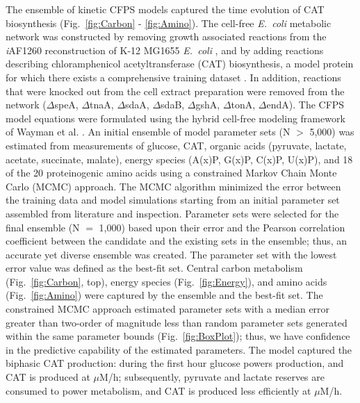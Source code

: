 \documentclass[12pt]{article}
\begin{document}
The ensemble of kinetic CFPS models captured the time evolution of CAT biosynthesis (Fig.~\ref{fig:Carbon} - \ref{fig:Amino}).
The cell-free \textit{E.~coli} metabolic network was constructed by removing growth associated reactions from the \textit{i}AF1260 reconstruction of K-12 MG1655 \textit{E.~coli} \cite{Feist:2007aa}, and by adding reactions describing chloramphenicol acetyltransferase (CAT) biosynthesis, a model protein for which there exists a comprehensive training dataset \cite{2005_calhoun_BiotechnologyProgress}.
In addition, reactions that were knocked out from the cell extract preparation were removed from the network ($\Delta$speA, $\Delta$tnaA, $\Delta$sdaA, $\Delta$sdaB, $\Delta$gshA, $\Delta$tonA, $\Delta$endA).
The CFPS model equations were formulated using the hybrid cell-free modeling framework of Wayman et al. \cite{pr3010138}.
An initial ensemble of model parameter sets (N $>$ 5,000) was estimated from measurements of glucose, CAT, organic acids (pyruvate, lactate, acetate, succinate, malate), energy species (A(x)P, G(x)P, C(x)P, U(x)P), and 18 of the 20 proteinogenic amino acids using a constrained Markov Chain Monte Carlo (MCMC) approach.
The MCMC algorithm minimized the error between the training data and model simulations starting from an initial parameter set assembled from literature and inspection.
Parameter sets were selected for the final ensemble (N $=$ 1,000) based upon their error and the Pearson correlation coefficient between the candidate and the existing sets in the ensemble; thus, an accurate yet diverse ensemble was created.
The parameter set with the lowest error value was defined as the best-fit set.
Central carbon metabolism (Fig.~\ref{fig:Carbon}, top), energy species (Fig.~\ref{fig:Energy}), and amino acids (Fig.~\ref{fig:Amino}) were captured by the ensemble and the best-fit set.
The constrained MCMC approach estimated parameter sets with a median error greater than two-order of magnitude less than random parameter sets generated within the same parameter bounds (Fig.~\ref{fig:BoxPlot}); thus, we have confidence in the predictive capability of the estimated parameters.
The model captured the biphasic CAT production: during the first hour glucose powers production, and CAT is produced at  $\mu$M/h; subsequently, pyruvate and lactate reserves are consumed to power metabolism, and CAT is produced less efficiently at  $\mu$M/h.
\end{document}
